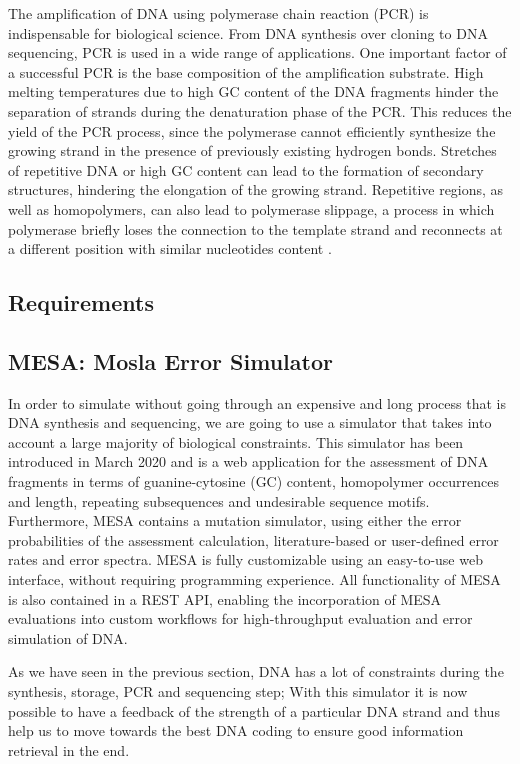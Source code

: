 The amplification of DNA using polymerase chain reaction (PCR) is indispensable for biological science. From DNA synthesis over cloning to DNA sequencing, PCR is used in a wide range of applications. 
One important factor of a successful PCR is the base composition of the amplification substrate. High melting temperatures due to high GC content of the DNA fragments hinder the separation of strands during the denaturation phase of the PCR. 
This reduces the yield of the PCR process, since the polymerase cannot efficiently synthesize the growing strand in the presence of previously existing hydrogen bonds. 
Stretches of repetitive DNA or high GC content can lead to the formation of secondary structures, hindering the elongation of the growing strand. 
Repetitive regions, as well as homopolymers, can also lead to polymerase slippage, a process in which polymerase briefly loses the connection to the template strand and reconnects at a different position with similar nucleotides content \cite{bib:102144}.

% 


\subsection{Requirements}

\tocontinue{}

\subsection{MESA: Mosla Error Simulator}

In order to simulate without going through an expensive and long process that is DNA synthesis and sequencing, we are going to use a simulator that takes into account a large majority of biological constraints.
This simulator has been introduced \cite{bib:10.1093/bioinformatics/btaa140} in March 2020 and is a web application for the assessment of DNA fragments in terms of guanine-cytosine (GC) content, homopolymer occurrences and length, repeating subsequences and undesirable sequence motifs.
Furthermore, MESA contains a mutation simulator, using either the error probabilities of the assessment calculation, literature-based or user-defined error rates and error spectra. MESA is fully customizable using an easy-to-use web interface, without requiring programming experience. All functionality of MESA is also contained in a REST API, enabling the incorporation of MESA evaluations into custom workflows for high-throughput evaluation and error simulation of DNA.

As we have seen in the previous section, DNA has a lot of constraints during the synthesis, storage, PCR and sequencing step; With this simulator it is now possible to have a feedback of the strength of a particular DNA strand and thus help us to move towards the best DNA coding to ensure good information retrieval in the end.

\tocontinue{}
